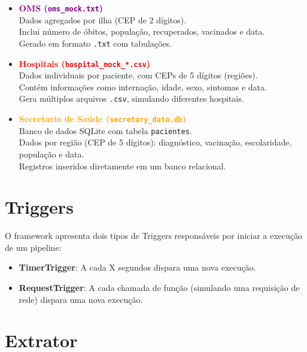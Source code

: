 \documentclass[a4paper,12pt]{article}
\begin{document}
\begin{itemize}
    \item \textcolor{purple}{\textbf{OMS (\texttt{oms\_mock.txt})}}\\
    Dados agregados por ilha (CEP de 2 dígitos).\\
    Inclui número de óbitos, população, recuperados, vacinados e data.\\
    Gerado em formato \texttt{.txt} com tabulações.
    
    \vspace{0.5em}
    
    \item \textcolor{red}{\textbf{Hospitais (\texttt{hospital\_mock\_*.csv})}}\\
    Dados individuais por paciente, com CEPs de 5 dígitos (regiões).\\
    Contém informações como internação, idade, sexo, sintomas e data.\\
    Gera múltiplos arquivos \texttt{.csv}, simulando diferentes hospitais.
    
    \vspace{0.5em}
    
    \item \textcolor{orange}{\textbf{Secretaria de Saúde (\texttt{secretary\_data.db})}}\\
    Banco de dados SQLite com tabela \texttt{pacientes}.\\
    Dados por região (CEP de 5 dígitos): diagnóstico, vacinação, escolaridade, população e data.\\
    Registros inseridos diretamente em um banco relacional.
\end{itemize}

\section{Triggers}
O framework apresenta dois tipos de Triggers responsáveis por iniciar a execução de um pipeline:

\begin{itemize}
    \item \textbf{TimerTrigger}: A cada X segundos dispara uma nova execução.
    \item \textbf{RequestTrigger}: A cada chamada de função (simulando uma requisição de rede) dispara uma nova
execução.
\end{itemize}

\section{Extrator}
\end{document}
